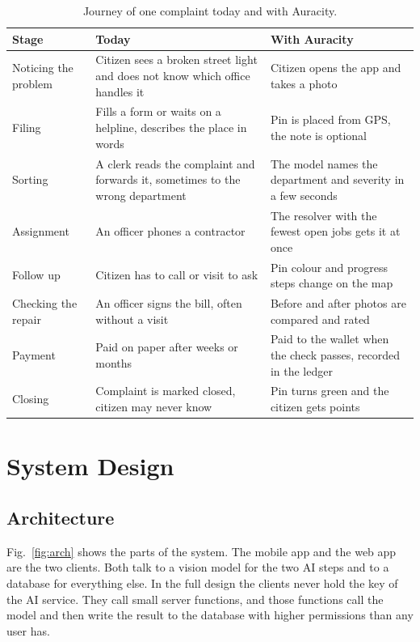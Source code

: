 \documentclass[conference,a4paper]{IEEEtran}
\begin{document}
\begin{table}[!t]\centering\footnotesize
\caption{Journey of one complaint today and with Auracity.}\label{tab:journey}
\begin{tabular}{L{2.6cm}L{6.9cm}L{7.3cm}}\toprule
\textbf{Stage} & \textbf{Today} & \textbf{With Auracity}\\\midrule
Noticing the problem & Citizen sees a broken street light and does not know which office handles it & Citizen opens the app and takes a photo\\
Filing & Fills a form or waits on a helpline, describes the place in words & Pin is placed from GPS, the note is optional\\
Sorting & A clerk reads the complaint and forwards it, sometimes to the wrong department & The model names the department and severity in a few seconds\\
Assignment & An officer phones a contractor & The resolver with the fewest open jobs gets it at once\\
Follow up & Citizen has to call or visit to ask & Pin colour and progress steps change on the map\\
Checking the repair & An officer signs the bill, often without a visit & Before and after photos are compared and rated\\
Payment & Paid on paper after weeks or months & Paid to the wallet when the check passes, recorded in the ledger\\
Closing & Complaint is marked closed, citizen may never know & Pin turns green and the citizen gets points\\\bottomrule
\end{tabular}\end{table}

\section{System Design}\label{sec:design}
\subsection{Architecture}
Fig.~\ref{fig:arch} shows the parts of the system. The mobile app and the web app are the two clients. Both talk to a vision model for the two AI steps and to a database for everything else. In the full design the clients never hold the key of the AI service. They call small server functions, and those functions call the model and then write the result to the database with higher permissions than any user has.
\end{document}
